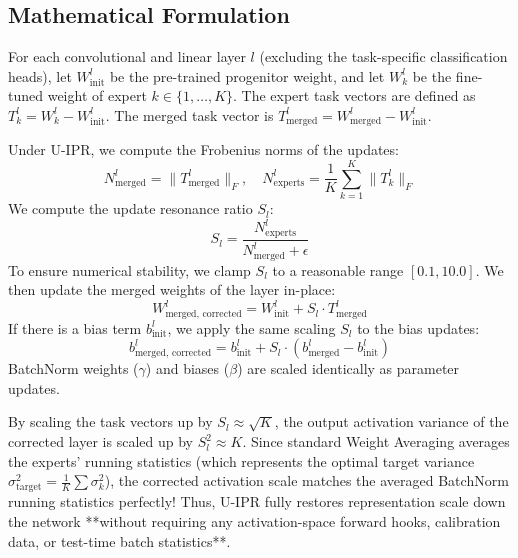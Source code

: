 \documentclass{article}
\begin{document}
\subsection{Mathematical Formulation}
For each convolutional and linear layer $l$ (excluding the task-specific classification heads), let $W_{\text{init}}^l$ be the pre-trained progenitor weight, and let $W_k^l$ be the fine-tuned weight of expert $k \in \{1, \dots, K\}$. The expert task vectors are defined as $T_k^l = W_k^l - W_{\text{init}}^l$.
The merged task vector is $T_{\text{merged}}^l = W_{\text{merged}}^l - W_{\text{init}}^l$.

Under U-IPR, we compute the Frobenius norms of the updates:
\begin{equation}
    N_{\text{merged}}^l = \|T_{\text{merged}}^l\|_F, \quad N_{\text{experts}}^l = \frac{1}{K} \sum_{k=1}^K \|T_k^l\|_F
\end{equation}
We compute the update resonance ratio $S_l$:
\begin{equation}
    S_l = \frac{N_{\text{experts}}^l}{N_{\text{merged}}^l + \epsilon}
\end{equation}
To ensure numerical stability, we clamp $S_l$ to a reasonable range $[0.1, 10.0]$. We then update the merged weights of the layer in-place:
\begin{equation}
    W_{\text{merged, corrected}}^l = W_{\text{init}}^l + S_l \cdot T_{\text{merged}}^l
\end{equation}
If there is a bias term $b_{\text{init}}^l$, we apply the same scaling $S_l$ to the bias updates:
\begin{equation}
    b_{\text{merged, corrected}}^l = b_{\text{init}}^l + S_l \cdot (b_{\text{merged}}^l - b_{\text{init}}^l)
\end{equation}
BatchNorm weights ($\gamma$) and biases ($\beta$) are scaled identically as parameter updates.

By scaling the task vectors up by $S_l \approx \sqrt{K}$, the output activation variance of the corrected layer is scaled up by $S_l^2 \approx K$. Since standard Weight Averaging averages the experts' running statistics (which represents the optimal target variance $\sigma^2_{\text{target}} = \frac{1}{K} \sum \sigma^2_k$), the corrected activation scale matches the averaged BatchNorm running statistics perfectly! Thus, U-IPR fully restores representation scale down the network **without requiring any activation-space forward hooks, calibration data, or test-time batch statistics**.
\end{document}
